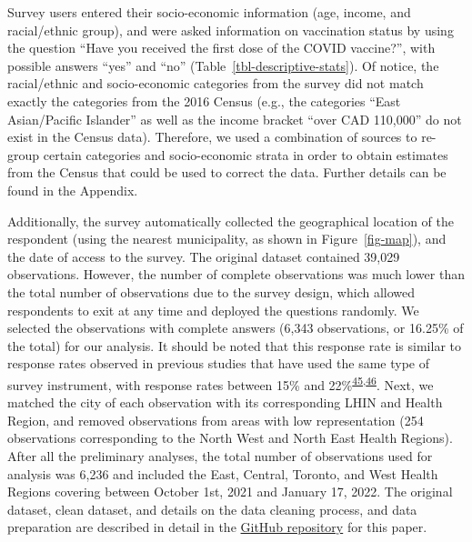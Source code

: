 \documentclass[
]{article}
\begin{document}
Survey users entered their socio-economic information (age, income, and
racial/ethnic group), and were asked information on vaccination status
by using the question ``Have you received the first dose of the COVID
vaccine?'', with possible answers ``yes'' and ``no''
(Table~\ref{tbl-descriptive-stats}). Of notice, the racial/ethnic and
socio-economic categories from the survey did not match exactly the
categories from the 2016 Census (e.g., the categories ``East
Asian/Pacific Islander'' as well as the income bracket ``over CAD
110,000'' do not exist in the Census data). Therefore, we used a
combination of sources to re-group certain categories and socio-economic
strata in order to obtain estimates from the Census that could be used
to correct the data. Further details can be found in the Appendix.

Additionally, the survey automatically collected the geographical
location of the respondent (using the nearest municipality, as shown in
Figure~\ref{fig-map}), and the date of access to the survey. The
original dataset contained 39,029 observations. However, the number of
complete observations was much lower than the total number of
observations due to the survey design, which allowed respondents to exit
at any time and deployed the questions randomly. We selected the
observations with complete answers (6,343 observations, or 16.25\% of
the total) for our analysis. It should be noted that this response rate
is similar to response rates observed in previous studies that have used
the same type of survey instrument, with response rates between 15\% and
22\%\textsuperscript{\protect\hyperlink{ref-kim2021}{45},\protect\hyperlink{ref-seeman2010}{46}}.
Next, we matched the city of each observation with its corresponding
LHIN and Health Region, and removed observations from areas with low
representation (254 observations corresponding to the North West and
North East Health Regions). After all the preliminary analyses, the
total number of observations used for analysis was 6,236 and included
the East, Central, Toronto, and West Health Regions covering between
October 1st, 2021 and January 17, 2022. The original dataset, clean
dataset, and details on the data cleaning process, and data preparation
are described in detail in the
\href{https://github.com/aimundo/Fields_COVID-19/}{GitHub repository}
for this paper.
\end{document}
